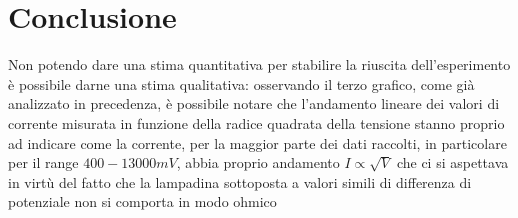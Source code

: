 \documentclass[10pt,twocolumn]{article}
\begin{document}
\section{Conclusione}
	Non potendo dare una stima quantitativa per stabilire la riuscita dell'esperimento è possibile darne una stima qualitativa: osservando il terzo grafico, come già analizzato in precedenza, è possibile notare che l'andamento lineare dei valori di corrente misurata in funzione della radice quadrata della tensione stanno proprio ad indicare come la corrente, per la maggior parte dei dati raccolti, in particolare per il range  $400-13000mV$, abbia proprio andamento $I \propto \sqrt{V}$ che ci si aspettava in virtù del fatto che la lampadina sottoposta a valori simili di differenza di potenziale non si comporta in modo ohmico
\end{document}
